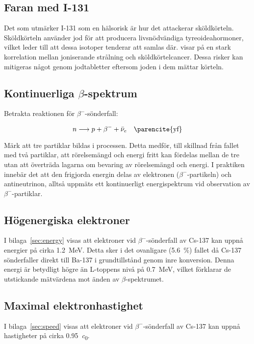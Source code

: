 \subsection{Faran med I-131}

Det som utmärker I-131 som en hälsorisk är hur det attackerar sköldkörteln.
Sköldkörteln använder jod för att producera livsnödvändiga tyreoideahormoner,
vilket leder till att dessa isotoper tenderar att samlas där. \cite{iodine}
visar på en stark korrelation mellan joniserande strålning och
sköldkörtelcancer. Dessa risker kan mitigeras något genom jodtabletter eftersom
joden i dem mättar körteln.

\subsection{Kontinuerliga $\beta$-spektrum}

Betrakta reaktionen för $\beta^-$-sönderfall:

\begin{equation}
    n \longrightarrow p + \beta^- + \bar{\nu}_e \quad \text{\parencite{yf}}
\end{equation}

Märk att tre partiklar bildas i processen. Detta medför, till skillnad från
fallet med två partiklar, att rörelsemängd och energi fritt kan fördelas
mellan de tre utan att överträda lagarna om bevaring av rörelsemängd och
energi. I praktiken innebär det att den frigjorda energin delas av elektronen
($\beta^-$-partikeln) och antineutrinon, alltså uppmäts ett kontinuerligt
energispektrum vid observation av $\beta^-$-partiklar.

\subsection{Högenergiska elektroner}

I bilaga~\ref{sec:energy} visas att elektroner vid $\beta^-$-sönderfall av
Cs-137 kan uppnå energier på cirka \qty{1.2}{\MeV}. Detta sker i det ovanligare
(\qty{5.6}{\percent}) fallet då Cs-137 sönderfaller direkt till Ba-137 i
grundtillstånd genom inre konversion. Denna energi är betydligt högre än
L-toppens nivå på \qty{0.7}{\MeV}, vilket förklarar de utstickande mätvärdena
mot änden av $\beta$-spektrumet.

\subsection{Maximal elektronhastighet}

I bilaga~\ref{sec:speed} visas att elektroner vid $\beta^-$-sönderfall av
Cs-137 kan uppnå hastigheter på cirka \qty{0.95}{\clight}.
